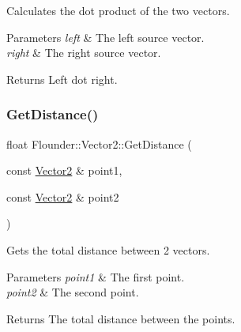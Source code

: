 Calculates the dot product of the two vectors. 


\begin{DoxyParams}{Parameters}
{\em left} & The left source vector. \\
\hline
{\em right} & The right source vector. \\
\hline
\end{DoxyParams}
\begin{DoxyReturn}{Returns}
Left dot right. 
\end{DoxyReturn}
\mbox{\label{class_flounder_1_1_vector2_ace3ca634e386db1bed62a848c3f7b078}} 
\subsubsection{\texorpdfstring{Get\+Distance()}{GetDistance()}}
{\footnotesize\ttfamily float Flounder\+::\+Vector2\+::\+Get\+Distance (\begin{DoxyParamCaption}\item[{const \hyperlink{class_flounder_1_1_vector2}{Vector2} \&}]{point1,  }\item[{const \hyperlink{class_flounder_1_1_vector2}{Vector2} \&}]{point2 }\end{DoxyParamCaption})\hspace{0.3cm}{\ttfamily [static]}}



Gets the total distance between 2 vectors. 


\begin{DoxyParams}{Parameters}
{\em point1} & The first point. \\
\hline
{\em point2} & The second point. \\
\hline
\end{DoxyParams}
\begin{DoxyReturn}{Returns}
The total distance between the points. 
\end{DoxyReturn}
\mbox{\label{class_flounder_1_1_vector2_ae07d36b33d37e74c2e68fe8c776686eb}} 
